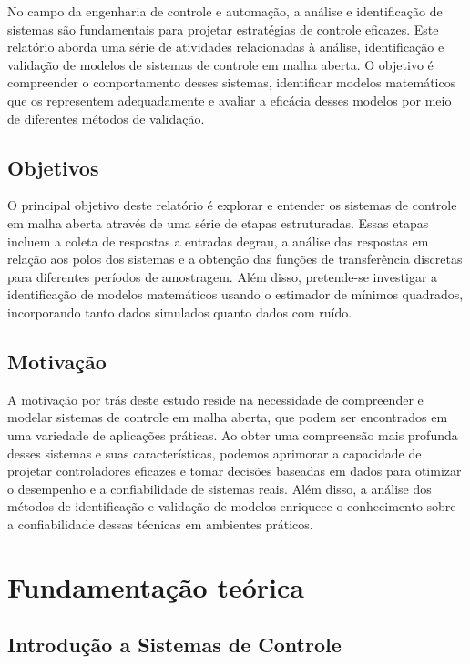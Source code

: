 \documentclass[a4paper,12pt]{article}
\begin{document}
    No campo da engenharia de controle e automação, a análise e identificação de sistemas são fundamentais para projetar estratégias de controle eficazes. Este relatório aborda uma série de atividades relacionadas à análise, identificação e validação de modelos de sistemas de controle em malha aberta. O objetivo é compreender o comportamento desses sistemas, identificar modelos matemáticos que os representem adequadamente e avaliar a eficácia desses modelos por meio de diferentes métodos de validação.

    \subsection{Objetivos}

    O principal objetivo deste relatório é explorar e entender os sistemas de controle em malha aberta através de uma série de etapas estruturadas. Essas etapas incluem a coleta de respostas a entradas degrau, a análise das respostas em relação aos polos dos sistemas e a obtenção das funções de transferência discretas para diferentes períodos de amostragem. Além disso, pretende-se investigar a identificação de modelos matemáticos usando o estimador de mínimos quadrados, incorporando tanto dados simulados quanto dados com ruído.
    
    \subsection{Motivação}

    A motivação por trás deste estudo reside na necessidade de compreender e modelar sistemas de controle em malha aberta, que podem ser encontrados em uma variedade de aplicações práticas. Ao obter uma compreensão mais profunda desses sistemas e suas características, podemos aprimorar a capacidade de projetar controladores eficazes e tomar decisões baseadas em dados para otimizar o desempenho e a confiabilidade de sistemas reais. Além disso, a análise dos métodos de identificação e validação de modelos enriquece o conhecimento sobre a confiabilidade dessas técnicas em ambientes práticos.

    \newpage

\section{Fundamentação teórica}
    \subsection{Introdução a Sistemas de Controle}
\end{document}
